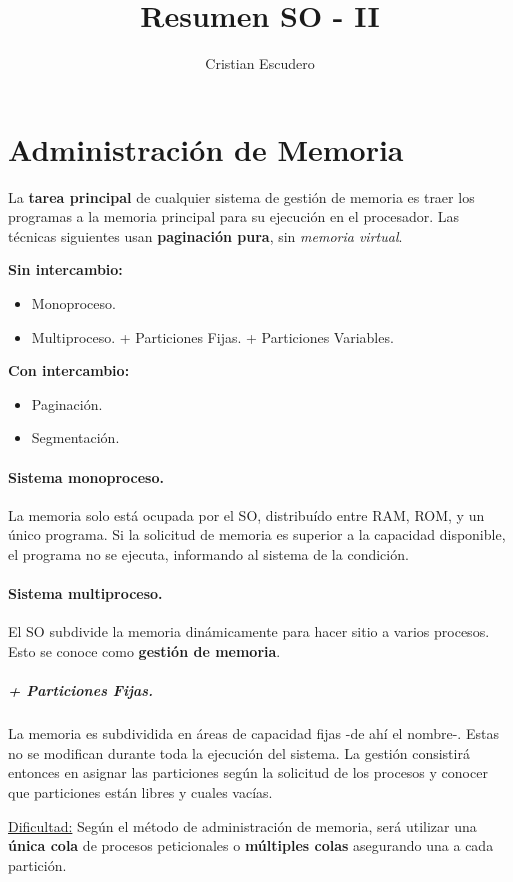 \documentclass[10pt,a4paper]{article}
\author{Cristian Escudero}
\title{Resumen SO - II}
\begin{document}
\maketitle
\section{Administración de Memoria}
La \textbf{tarea principal} de cualquier sistema de gestión de memoria es traer los programas a la memoria principal para su ejecución en el procesador. Las técnicas siguientes usan \textbf{paginación pura}, sin \textit{memoria virtual}.

\begin{multicols}{2} 
\textbf{Sin intercambio:}
\begin{itemize}
\item Monoproceso.
\item Multiproceso.
\subitem + Particiones Fijas.
\subitem + Particiones Variables.
\end{itemize}
\columnbreak
\textbf{Con intercambio:}
\begin{itemize}
\item Paginación.
\item Segmentación.
\subitem $ $
\subitem $ $
\end{itemize}
\end{multicols}
 
\paragraph{Sistema monoproceso.} La memoria solo está ocupada por el SO, distribuído entre RAM, ROM, y un único programa. Si la solicitud de memoria es superior a la capacidad disponible, el programa no se ejecuta, informando al sistema de la condición.

\paragraph{Sistema multiproceso.} El SO subdivide la memoria dinámicamente para hacer sitio a varios procesos. Esto se conoce como \textbf{gestión de memoria}.
 
\subparagraph{+ Particiones Fijas.} La memoria es subdividida en áreas de capacidad fijas -de ahí el nombre-. Estas no se modifican durante toda la ejecución del sistema. La gestión consistirá entonces en asignar las particiones según la solicitud de los procesos y conocer que particiones están libres y cuales vacías.

\underline{Dificultad:} Según el método de administración de memoria, será utilizar una \textbf{única cola} de procesos peticionales o \textbf{múltiples colas} asegurando una a cada partición.
\end{document}
